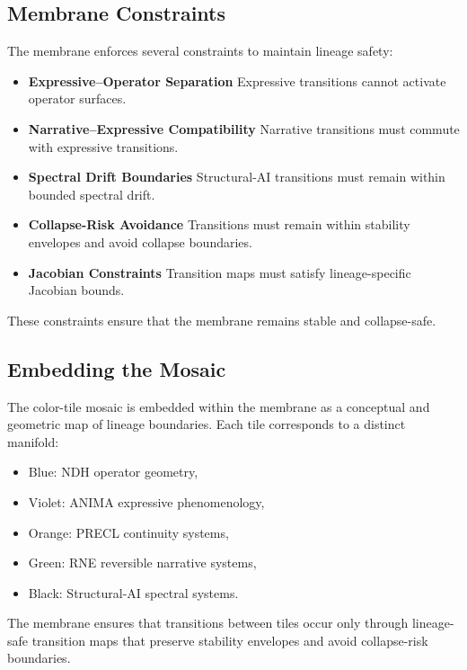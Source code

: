 \subsection{Membrane Constraints}

The membrane enforces several constraints to maintain lineage safety:

\begin{itemize}
    \item \textbf{Expressive–Operator Separation}  
    Expressive transitions cannot activate operator surfaces.

    \item \textbf{Narrative–Expressive Compatibility}  
    Narrative transitions must commute with expressive transitions.

    \item \textbf{Spectral Drift Boundaries}  
    Structural-AI transitions must remain within bounded spectral drift.

    \item \textbf{Collapse-Risk Avoidance}  
    Transitions must remain within stability envelopes and avoid collapse
    boundaries.

    \item \textbf{Jacobian Constraints}  
    Transition maps must satisfy lineage-specific Jacobian bounds.
\end{itemize}

These constraints ensure that the membrane remains stable and collapse-safe.

\subsection{Embedding the Mosaic}

The color-tile mosaic is embedded within the membrane as a conceptual and
geometric map of lineage boundaries. Each tile corresponds to a distinct
manifold:

\begin{itemize}
    \item Blue: NDH operator geometry,
    \item Violet: ANIMA expressive phenomenology,
    \item Orange: PRECL continuity systems,
    \item Green: RNE reversible narrative systems,
    \item Black: Structural-AI spectral systems.
\end{itemize}

The membrane ensures that transitions between tiles occur only through
lineage-safe transition maps that preserve stability envelopes and avoid
collapse-risk boundaries.

